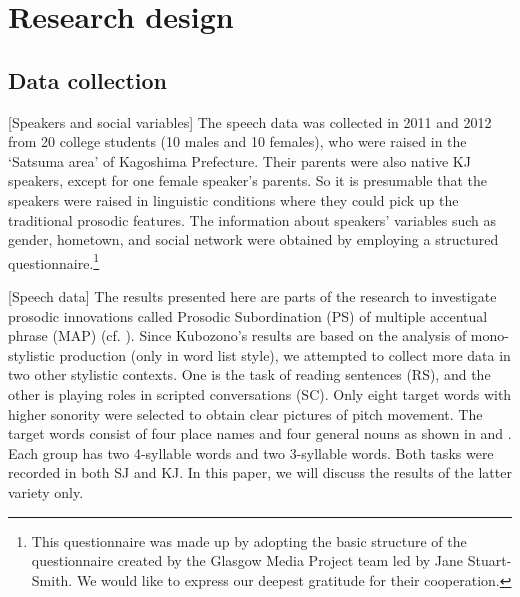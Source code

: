 \documentclass[output=paper]{LSP/langsci}
\begin{document}
\section{Research design}

\subsection{Data collection}

[Speakers and social variables] The speech data was collected in 2011 and 2012 from 20 college students (10 males and 10 females), who were raised in the ‘Satsuma area’ of Kagoshima Prefecture. Their parents were also native KJ speakers, except for one female speaker’s parents. So it is presumable that the speakers were raised in linguistic conditions where they could pick up the traditional prosodic features. The information about speakers’ variables such as gender, hometown, and social network were obtained by employing a structured questionnaire.\footnote{ This questionnaire was made up by adopting the basic structure of the questionnaire created by the Glasgow Media Project team led by Jane Stuart-Smith. We would like to express our deepest gratitude for their cooperation.}

[Speech data] The results presented here are parts of the research to investigate prosodic innovations called Prosodic Subordination (PS) of multiple accentual phrase (MAP) (cf. \citealt{androutsopoulos_media_2014}). Since Kubozono’s results are based on the analysis of mono-stylistic production (only in word list style), we attempted to collect more data in two other stylistic contexts. One is the task of reading sentences (RS), and the other is playing roles in scripted conversations (SC). Only eight target words with higher sonority were selected to obtain clear pictures of pitch movement. The target words consist of four place names and four general nouns as shown in  and . Each group has two 4-syllable words and two 3-syllable words. Both tasks were recorded in both SJ and KJ. In this paper, we will discuss the results of the latter variety only.
\end{document}
